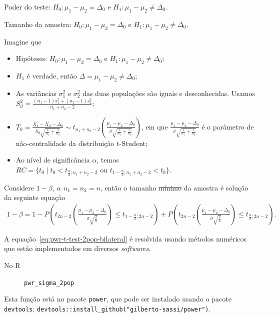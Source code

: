 \documentclass[9pt]{beamer}
\begin{document}
\begin{frame}{Poder do teste: $H_0:\mu_1 - \mu_2 = \Delta_0$ e $H_1: \mu_1 - \mu_2 \neq \Delta_0$.}
\normalsize

\end{frame}


\begin{frame}[fragile]{Tamanho da amostra: $H_0:\mu_1 - \mu_2 = \Delta_0$ e $H_1: \mu_1 - \mu_2 \neq \Delta_0$.}

\tiny

Imagine que
\begin{itemize}
	\item Hipóteses: $H_0: \mu_1 - \mu_2 = \Delta_0$ e $H_1: \mu_1 -  \mu_2 \neq \Delta_0$;
	\item $H_1$ é verdade, então $\Delta = \mu_1-\mu_2 \neq \Delta_0$;
	\item As variâncias $\sigma_1^2$  e $\sigma_2^2$ das duas populações são iguais e desconhecidas. Usamos $S_d^2 = \frac{(n_1-1)s_1^2 + (n_2-1)s_2^2}{n_1+n_2-2}$;
	\item $T_0 = \frac{\bar{X}_1 - \bar{X}_2 - \Delta_0}{ S_d \sqrt{ \frac{1}{n_1} + \frac{1}{n_2} } } \sim t_{n_1+n_2-2}\left( \frac{\mu_1 - \mu_2 - \Delta_0}{\sigma \sqrt{\frac{1}{n_1} + \frac{1}{n_2}}} \right)$, em que $\frac{\mu_1 - \mu_2 - \Delta_0}{\sigma \sqrt{\frac{1}{n_1} + \frac{1}{n_2}}}$ é o parâmetro de não-centralidade da distribuição t-Student;
	\item Ao nível de significância $\alpha$, temos $RC = \{ t_0 \mid t_0 < t_{\frac{\alpha}{2};n_1+n_2-2} \mbox{ ou } t_{1-\frac{\alpha}{2};n_1+n_2-2} < t_0  \}$.
\end{itemize}
\vfill

Considere $1-\beta$, $\alpha$ $n_1=n_2=n$, então o tamanho \sout{mínimo} da amostra é solução da seguinte equação
\begin{align} \label{eq:pwr-t-test-2pop-bilateral}
1-\beta = 1 - P\left( t_{2n-2}\left( \frac{\mu_1 - \mu_2 - \Delta_0}{\sigma \sqrt{\frac{2}{n}}} \right) \leq t_{1-\frac{\alpha}{2};2n-2} \right) + P\left( t_{2n-2}\left( \frac{\mu_1 - \mu_2 - \Delta_0}{\sigma \sqrt{\frac{2}{n}}} \right) \leq t_{\frac{\alpha}{2};2n-2} \right).
\end{align}

A equação~\eqref{eq:pwr-t-test-2pop-bilateral} é resolvida usando métodos numéricos que estão implementados em diversos \textit{softwares}.
\begin{description}
	\item[No R] \lstinline|pwr_sigma_2pop|
\end{description}
Esta função está no pacote \lstinline|power|, que pode ser instalado usando o pacote \lstinline|devtools|: \lstinline|devtools::install_github("gilberto-sassi/power")|.

\normalsize
\end{frame}
\end{document}
